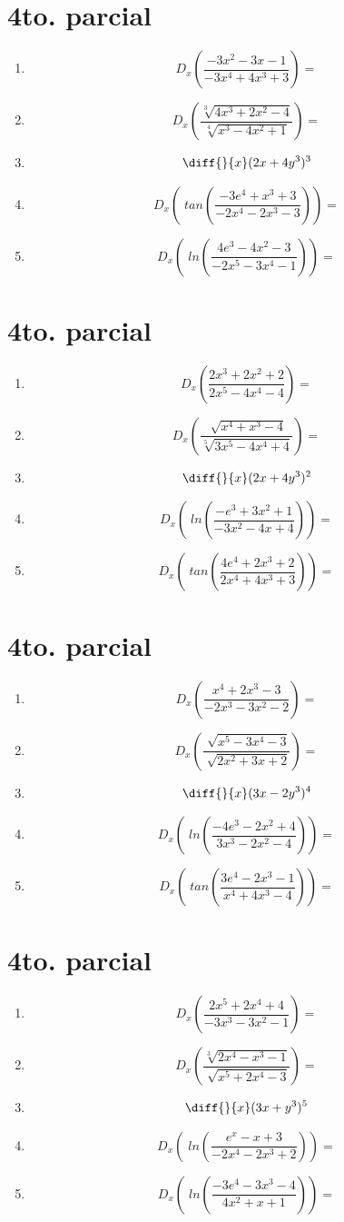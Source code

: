 \documentclass[oneside,spanish,letter]{article}
\begin{document}
\section{4to. parcial}
\begin{enumerate}
 \item $$ D_x \left( \frac{-3x^2-3x-1}{-3x^4+4x^3+3}\right)=$$
 \item $$ D_x \left( \frac{\sqrt[3]{4x^3+2x^2-4}}{\sqrt[4]{x^3-4x^2+1}}\right)=$$
\item $$\diff{}{x}(2x+4y^3)^3$$
 \item $$ D_x \left(\;tan\left( \frac{-3e^4+x^3+3}{-2x^4-2x^3-3}\right)\right)=$$
 \item $$ D_x \left(\;ln\left( \frac{4e^3-4x^2-3}{-2x^5-3x^4-1}\right)\right)=$$
 \end{enumerate}
  \newpage
\section{4to. parcial}
\begin{enumerate}
 \item $$ D_x \left( \frac{2x^3+2x^2+2}{2x^5-4x^4-4}\right)=$$
 \item $$ D_x \left( \frac{\sqrt[]{x^4+x^3-4}}{\sqrt[5]{3x^5-4x^4+4}}\right)=$$
\item $$\diff{}{x}(2x+4y^3)^2$$
 \item $$ D_x \left(\;ln\left( \frac{-e^3+3x^2+1}{-3x^2-4x+4}\right)\right)=$$
 \item $$ D_x \left(\;tan\left( \frac{4e^4+2x^3+2}{2x^4+4x^3+3}\right)\right)=$$
 \end{enumerate}
  \newpage
\section{4to. parcial}
\begin{enumerate}
 \item $$ D_x \left( \frac{x^4+2x^3-3}{-2x^3-3x^2-2}\right)=$$
 \item $$ D_x \left( \frac{\sqrt[]{x^5-3x^4-3}}{\sqrt[]{2x^2+3x+2}}\right)=$$
\item $$\diff{}{x}(3x-2y^3)^4$$
 \item $$ D_x \left(\;ln\left( \frac{-4e^3-2x^2+4}{3x^3-2x^2-4}\right)\right)=$$
 \item $$ D_x \left(\;tan\left( \frac{3e^4-2x^3-1}{x^4+4x^3-4}\right)\right)=$$
 \end{enumerate}
  \newpage
\section{4to. parcial}
\begin{enumerate}
 \item $$ D_x \left( \frac{2x^5+2x^4+4}{-3x^3-3x^2-1}\right)=$$
 \item $$ D_x \left( \frac{\sqrt[3]{2x^4-x^3-1}}{\sqrt[]{x^5+2x^4-3}}\right)=$$
\item $$\diff{}{x}(3x+y^3)^5$$
 \item $$ D_x \left(\;ln\left( \frac{e^x-x+3}{-2x^4-2x^3+2}\right)\right)=$$
 \item $$ D_x \left(\;ln\left( \frac{-3e^4-3x^3-4}{4x^2+x+1}\right)\right)=$$
 \end{enumerate}
  \newpage
\end{document}
